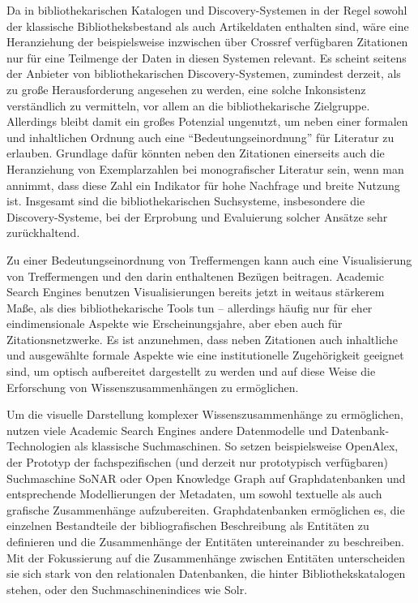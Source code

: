 \documentclass[a4paper,
fontsize=11pt,
oneside,
numbers=noperiodatend,
parskip=half-,
bibliography=totoc,
final
]{scrartcl}
\begin{document}
Da in bibliothekarischen Katalogen und Discovery-Systemen in der Regel
sowohl der klassische Bibliotheksbestand als auch Artikeldaten enthalten
sind, wäre eine Heranziehung der beispielsweise inzwischen über Crossref
verfügbaren Zitationen nur für eine Teilmenge der Daten in diesen
Systemen relevant. Es scheint seitens der Anbieter von
bibliothekarischen Discovery-Systemen, zumindest derzeit, als zu große
Herausforderung angesehen zu werden, eine solche Inkonsistenz
verständlich zu vermitteln, vor allem an die bibliothekarische
Zielgruppe. Allerdings bleibt damit ein großes Potenzial ungenutzt, um
neben einer formalen und inhaltlichen Ordnung auch eine
\enquote{Bedeutungseinordnung} für Literatur zu erlauben. Grundlage
dafür könnten neben den Zitationen einerseits auch die Heranziehung von
Exemplarzahlen bei monografischer Literatur sein, wenn man annimmt, dass
diese Zahl ein Indikator für hohe Nachfrage und breite Nutzung ist.
Insgesamt sind die bibliothekarischen Suchsysteme, insbesondere die
Discovery-Systeme, bei der Erprobung und Evaluierung solcher Ansätze
sehr zurückhaltend.

Zu einer Bedeutungseinordnung von Treffermengen kann auch eine
Visualisierung von Treffermengen und den darin enthaltenen Bezügen
beitragen. Academic Search Engines benutzen Visualisierungen bereits
jetzt in weitaus stärkerem Maße, als dies bibliothekarische Tools tun --
allerdings häufig nur für eher eindimensionale Aspekte wie
Erscheinungsjahre, aber eben auch für Zitationsnetzwerke. Es ist
anzunehmen, dass neben Zitationen auch inhaltliche und ausgewählte
formale Aspekte wie eine institutionelle Zugehörigkeit geeignet sind, um
optisch aufbereitet dargestellt zu werden und auf diese Weise die
Erforschung von Wissenszusammenhängen zu ermöglichen.

Um die visuelle Darstellung komplexer Wissenszusammenhänge zu
ermöglichen, nutzen viele Academic Search Engines andere Datenmodelle
und Datenbank-Technologien als klassische Suchmaschinen. So setzen
beispielsweise OpenAlex, der Prototyp der fachspezifischen (und derzeit
nur prototypisch verfügbaren) Suchmaschine SoNAR oder Open Knowledge
Graph auf Graphdatenbanken und entsprechende Modellierungen der
Metadaten, um sowohl textuelle als auch grafische Zusammenhänge
aufzubereiten. Graphdatenbanken ermöglichen es, die einzelnen
Bestandteile der bibliografischen Beschreibung als Entitäten zu
definieren und die Zusammenhänge der Entitäten untereinander zu
beschreiben. Mit der Fokussierung auf die Zusammenhänge zwischen
Entitäten unterscheiden sie sich stark von den relationalen Datenbanken,
die hinter Bibliothekskatalogen stehen, oder den Suchmaschinenindices
wie Solr.
\end{document}

